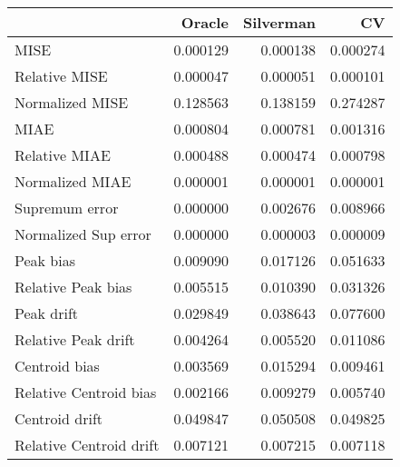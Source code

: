\begin{tabular}{lrrr}
  \toprule
 & Oracle & Silverman & CV \\ 
  \midrule
MISE & 0.000129 & 0.000138 & 0.000274 \\ 
  Relative MISE & 0.000047 & 0.000051 & 0.000101 \\ 
  Normalized MISE & 0.128563 & 0.138159 & 0.274287 \\ 
  MIAE & 0.000804 & 0.000781 & 0.001316 \\ 
  Relative MIAE & 0.000488 & 0.000474 & 0.000798 \\ 
  Normalized MIAE & 0.000001 & 0.000001 & 0.000001 \\ 
  Supremum error & 0.000000 & 0.002676 & 0.008966 \\ 
  Normalized Sup error & 0.000000 & 0.000003 & 0.000009 \\ 
  Peak bias & 0.009090 & 0.017126 & 0.051633 \\ 
  Relative Peak bias & 0.005515 & 0.010390 & 0.031326 \\ 
  Peak drift & 0.029849 & 0.038643 & 0.077600 \\ 
  Relative Peak drift & 0.004264 & 0.005520 & 0.011086 \\ 
  Centroid bias & 0.003569 & 0.015294 & 0.009461 \\ 
  Relative Centroid bias & 0.002166 & 0.009279 & 0.005740 \\ 
  Centroid drift & 0.049847 & 0.050508 & 0.049825 \\ 
  Relative Centroid drift & 0.007121 & 0.007215 & 0.007118 \\ 
   \bottomrule
\end{tabular}
